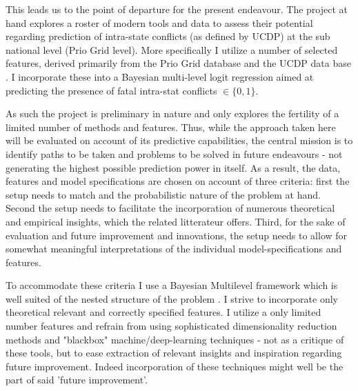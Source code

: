 \documentclass[a4paper]{article}
\begin{document}
This leads us to the point of departure for the present endeavour. The project at hand explores a roster of modern tools and data to assess their potential regarding prediction of intra-state conflicts (as defined by UCDP) at the sub national level (Prio Grid level). More specifically I utilize a number of selected features, derived primarily from the Prio Grid database \citep{Tollefsen_2012} and the UCDP data base \citep{UCDP_2017}. I incorporate these into a Bayesian multi-level logit regression aimed at predicting the presence of fatal intra-stat conflicts $\in \{0,1\}$.\par


As such the project is preliminary in nature and only explores the fertility of a limited number of methods and features. Thus, while the approach taken here will be evaluated on account of its predictive capabilities, the central mission is to identify paths to be taken and problems to be solved in future endeavours - not generating the highest possible prediction power in itself. As a result, the data, features and model specifications are chosen on account of three criteria: first the setup needs to match and the probabilistic nature of the problem at hand. Second the setup needs to facilitate the incorporation of numerous theoretical and empirical insights, which the related litterateur offers. Third, for the sake of evaluation and future improvement and innovations, the setup needs to allow for somewhat meaningful interpretations of the individual model-specifications and features.\par

To accommodate these criteria I use a Bayesian Multilevel framework which is well suited of the nested structure of the problem \cite[XXX]{Gelman_2006}. I strive to incorporate only theoretical relevant and correctly specified features. I utilize a only limited number features and refrain from using sophisticated dimensionality reduction methods and "blackbox" machine/deep-learning techniques - not as a critique of these tools, but to ease extraction of relevant insights and inspiration regarding future improvement. Indeed incorporation of these techniques might well be the part of said 'future improvement'.
\end{document}
